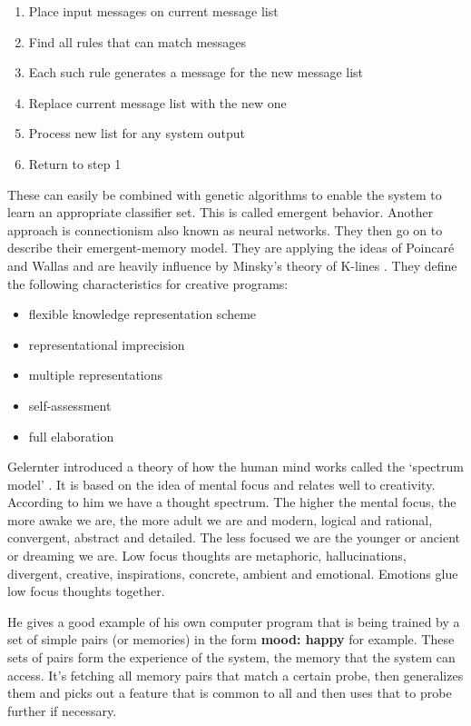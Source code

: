\begin{enumerate}
  \item Place input messages on current message list
  \item Find all rules that can match messages
  \item Each such rule generates a message for the new message list
  \item Replace current message list with the new one
  \item Process new list for any system output
  \item Return to step 1
\end{enumerate}

These can easily be combined with genetic algorithms to enable the system to learn an appropriate classifier set. This is called emergent behavior. Another approach is connectionism also known as neural networks. They then go on to describe their emergent-memory model. They are applying the ideas of Poincar{\'e} and Wallas and are heavily influence by Minsky's theory of K-lines \citeyear{Minsky1980, Minsky1988}. They define the following characteristics for creative programs:

\begin{itemize}
  \item flexible knowledge representation scheme
  \item representational imprecision
  \item multiple representations
  \item self-assessment
  \item full elaboration
\end{itemize}

\spirals

Gelernter introduced a theory of how the human mind works called the `spectrum model' \citeyear{Gelernter1994}. It is based on the idea of mental focus and relates well to creativity. According to him we have a thought spectrum. The higher the mental focus, the more awake we are, the more adult we are and modern, logical and rational, convergent, abstract and detailed. The less focused we are the younger or ancient or dreaming we are. Low focus thoughts are metaphoric, hallucinations, divergent, creative, inspirations, concrete, ambient and emotional. Emotions glue low focus thoughts together.

He gives a good example of his own computer program that is being trained by a set of simple pairs (or memories) in the form \textbf{mood: happy} for example. These sets of pairs form the experience of the system, the memory that the system can access. It's fetching all memory pairs that match a certain probe, then generalizes them and picks out a feature that is common to all and then uses that to probe further if necessary.

